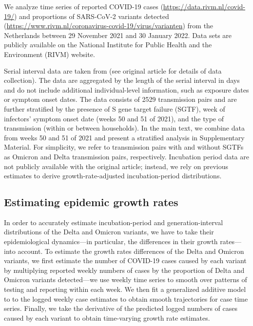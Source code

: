 \documentclass[12pt]{article}
\begin{document}
We analyze time series of reported COVID-19 cases (\url{https://data.rivm.nl/covid-19/}) and proportions of SARS-CoV-2 variants detected (\url{https://www.rivm.nl/coronavirus-covid-19/virus/varianten}) from the Netherlands between 29 November 2021 and 30 January 2022.
Data sets are publicly available on the National Institute for Public Health and the Environment (RIVM) website.

Serial interval data are taken from \cite{backer2021omicron} (see original article for details of data collection).
The data are aggregated by the length of the serial interval in days and do not include additional individual-level information, such as exposure dates or symptom onset dates.
The data consists of 2529 transmission pairs and are further stratified by the presence of S gene target failure (SGTF), week of infectors' symptom onset date (weeks 50 and 51 of 2021), and the type of transmission (within or between households).
In the main text, we combine data from weeks 50 and 51 of 2021 and present a stratified analysis in Supplementary Material.
For simplicity, we refer to transmission pairs with and without SGTFs as Omicron and Delta transmission pairs, respectively.
Incubation period data are not publicly available with the original article; instead, we rely on previous estimates \cite{backer2021omicron} to derive growth-rate-adjusted incubation-period distributions.

\subsection{Estimating epidemic growth rates}

In order to accurately estimate incubation-period and generation-interval distributions of the Delta and Omicron variants, we have to take their epidemiological dynamics---in particular, the differences in their growth rates---into account.
To estimate the growth rates differences of the Delta and Omicron variants, we first estimate the number of COVID-19 cases caused by each variant by multiplying reported weekly numbers of cases by the proportion of Delta and Omicron variants detected---we use weekly time series to smooth over patterns of testing and reporting within each week. 
We then fit a generalized additive model \citep{wood2001mgcv} to to the logged weekly case estimates to obtain smooth trajectories for case time series.
Finally, we take the derivative of the predicted logged numbers of cases caused by each variant to obtain time-varying growth rate estimates.
\end{document}
